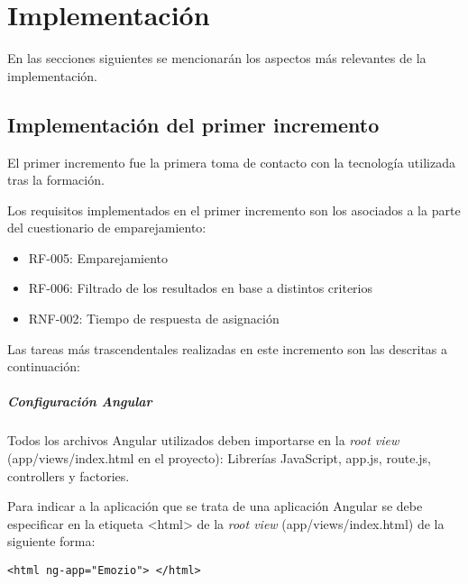 \chapter{Implementación}

En las secciones siguientes se mencionarán los aspectos más relevantes de la implementación.\newline

\section{Implementación del primer incremento}
El primer incremento fue la primera toma de contacto con la tecnología utilizada tras la formación.\newline



Los requisitos implementados en el primer incremento son los asociados a la parte del cuestionario de emparejamiento:



\begin{itemize}
\item RF-005: Emparejamiento 
\item RF-006: Filtrado de los resultados en base a distintos criterios
\item RNF-002: Tiempo de respuesta de asignación
\end{itemize}



Las tareas más trascendentales realizadas en este incremento son las descritas a continuación:


 
\paragraph*{Configuración Angular}
Todos los archivos Angular utilizados deben importarse en la \textit{root view} (app/views/index.html en el proyecto): Librerías JavaScript, app.js, route.js, controllers y factories.\newline



Para indicar a la aplicación que se trata de una aplicación Angular se debe especificar en la etiqueta <html> de la \textit{root view} (app/views/index.html) de la siguiente forma:



\medskip
\begin{lstlisting}
<html ng-app="Emozio"> </html>
\end{lstlisting}



